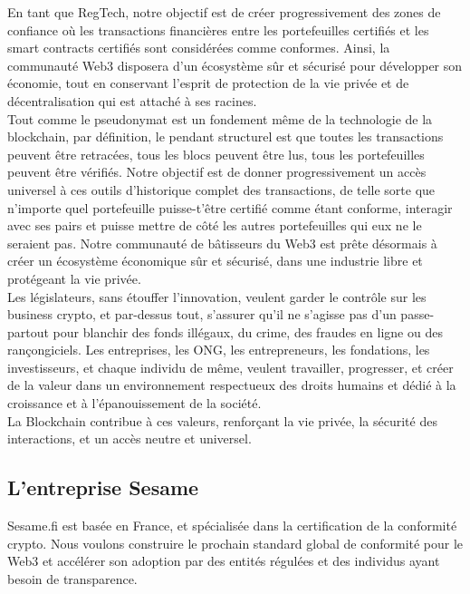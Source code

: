 ﻿\documentclass[a4paper]{article}
\begin{document}
En tant que RegTech, notre objectif est de créer progressivement des zones de confiance où les transactions financières entre les portefeuilles certifiés et les smart contracts certifiés sont considérées comme conformes. Ainsi, la communauté Web3 disposera d'un écosystème sûr et sécurisé pour développer son économie, tout en conservant l'esprit de protection de la vie privée et de décentralisation qui est attaché à ses racines. \\

Tout comme le pseudonymat est un fondement même de la technologie de la blockchain, par définition, le pendant structurel est que toutes les transactions peuvent être retracées, tous les blocs peuvent être lus, tous les portefeuilles peuvent être vérifiés. Notre objectif est de donner progressivement un accès universel à ces outils d’historique complet des transactions, de telle sorte que n’importe quel portefeuille puisse-t’être certifié comme étant conforme, interagir avec ses pairs et puisse mettre de côté les autres portefeuilles qui eux ne le seraient pas. Notre communauté de bâtisseurs du Web3 est prête désormais à créer un écosystème économique sûr et sécurisé, dans une industrie libre et protégeant la vie privée. \\

Les législateurs, sans étouffer l’innovation, veulent garder le contrôle sur les business crypto, et par-dessus tout, s’assurer qu’il ne s’agisse pas d’un passe-partout pour blanchir des fonds illégaux, du crime, des fraudes en ligne ou des rançongiciels. Les entreprises, les ONG, les entrepreneurs, les fondations, les investisseurs, et chaque individu de même, veulent travailler, progresser, et créer de la valeur dans un environnement respectueux des droits humains et dédié à la croissance et à l'épanouissement de la société. \\

La Blockchain contribue à ces valeurs, renforçant la vie privée, la sécurité des interactions, et un accès neutre et universel.

\subsection{L’entreprise Sesame}
Sesame.fi est basée en France, et spécialisée dans la certification de la conformité crypto. Nous voulons construire le prochain standard global de conformité pour le Web3 et accélérer son adoption par des entités régulées et des individus ayant besoin de transparence. \\
\end{document}
